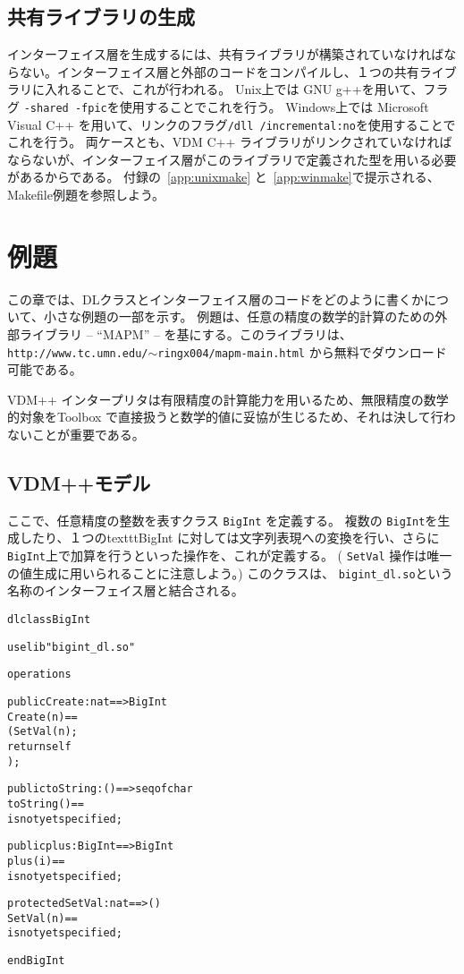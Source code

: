 \documentclass[\pformat,12pt]{jarticle}
\begin{document}
\subsection{共有ライブラリの生成}

インターフェイス層を生成するには、共有ライブラリが構築されていなければならない。インターフェイス層と外部のコードをコンパイルし、１つの共有ライブラリに入れることで、これが行われる。
Unix上では GNU g++を用いて、フラグ \texttt{-shared -fpic}を使用することでこれを行う。
Windows上では Microsoft Visual C++ を用いて、リンクのフラグ\texttt{/dll /incremental:no}を使用することでこれを行う。
両ケースとも、VDM C++ ライブラリがリンクされていなければならないが、インターフェイス層がこのライブラリで定義された型を用いる必要があるからである。
付録の~\ref{app:unixmake} と~\ref{app:winmake}で提示される、Makefile例題を参照しよう。 

\section{例題}\label{sec:dlexample}

この章では、DLクラスとインターフェイス層のコードをどのように書くかについて、小さな例題の一部を示す。
例題は、任意の精度の数学的計算のための外部ライブラリ -- ``MAPM'' -- を基にする。このライブラリは、
\texttt{http://www.tc.umn.edu/$\sim$ringx004/mapm-main.html}
から無料でダウンロード可能である。

 VDM++ インタープリタは有限精度の計算能力を用いるため、無限精度の数学的対象をToolbox で直接扱うと数学的値に妥協が生じるため、それは決して行わないことが重要である。 

\subsection{VDM++モデル}

ここで、任意精度の整数を表すクラス \texttt{BigInt} を定義する。 
複数の \texttt{BigInt}を生成したり、１つのtexttt{BigInt} に対しては文字列表現への変換を行い、さらに \texttt{BigInt}上で加算を行うといった操作を、これが定義する。 
( \texttt{SetVal} 操作は唯一の値生成に用いられることに注意しよう。) 
このクラスは、 \texttt{bigint\_dl.so}という名称のインターフェイス層と結合される。 

\begin{alltt}
\textsf{dlclass} BigInt

\textsf{uselib} "bigint_dl.so"

\textsf{operations}

\textsf{public} Create : \textsf{nat} ==> BigInt
Create(n) ==
( SetVal(n);
  \textsf{return} self
);

\textsf{public} toString : () ==> \textsf{seq} \textsf{of} \textsf{char}
toString() ==
  \textsf{is} \textsf{not} \textsf{yet} \textsf{specified};

\textsf{public} plus : BigInt ==> BigInt
plus(i) ==
  \textsf{is} \textsf{not} \textsf{yet} \textsf{specified};

\textsf{protected} SetVal : \textsf{nat} ==> ()
SetVal(n) ==
  \textsf{is} \textsf{not} \textsf{yet} \textsf{specified};

\textsf{end} BigInt
\end{alltt}
\end{document}
